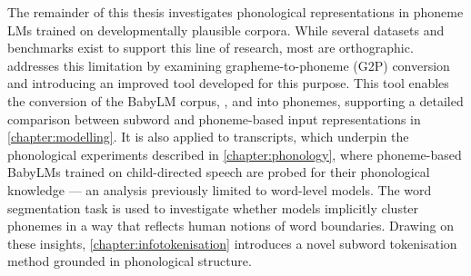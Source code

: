 The remainder of this thesis investigates phonological representations in phoneme LMs trained on developmentally plausible corpora. While several datasets and benchmarks exist to support this line of research, most are orthographic.  addresses this limitation by examining grapheme-to-phoneme (G2P) conversion and introducing an improved tool developed for this purpose. This tool enables the conversion of the BabyLM corpus, \blimp, and \glue into phonemes, supporting a detailed comparison between subword and phoneme-based input representations in \cref{chapter:modelling}. It is also applied to \childes transcripts, which underpin the phonological experiments described in \cref{chapter:phonology}, where phoneme-based BabyLMs trained on child-directed speech are probed for their phonological knowledge --- an analysis previously limited to word-level models. The word segmentation task is used to investigate whether models implicitly cluster phonemes in a way that reflects human notions of word boundaries. Drawing on these insights, \cref{chapter:infotokenisation} introduces a novel subword tokenisation method grounded in phonological structure.


